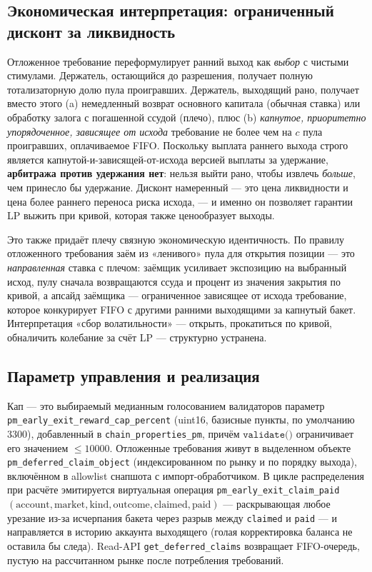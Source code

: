 \documentclass{ledger}
\theoremstyle{plain}
\theoremstyle{remark}
\begin{document}
\subsection{Экономическая интерпретация: ограниченный дисконт за ликвидность}\label{sec:defecon}

Отложенное требование переформулирует ранний выход как \emph{выбор} с чистыми
стимулами. Держатель, остающийся до разрешения, получает полную тотализаторную долю
пула проигравших. Держатель, выходящий рано, получает вместо этого (a) немедленный
возврат основного капитала (обычная ставка) или обработку залога с погашенной ссудой
(плечо), плюс (b) \emph{капнутое, приоритетно упорядоченное, зависящее от исхода}
требование не более чем на $c$ пула проигравших, оплачиваемое FIFO. Поскольку выплата
раннего выхода строго является капнутой-и-зависящей-от-исхода версией выплаты за
удержание, \textbf{арбитража против удержания нет}: нельзя выйти рано, чтобы извлечь
\emph{больше}, чем принесло бы удержание. Дисконт намеренный --- это цена ликвидности
и цена более раннего переноса риска исхода, --- и именно он позволяет гарантии LP
выжить при кривой, которая также ценообразует выходы.

Это также придаёт плечу связную экономическую идентичность. По правилу отложенного
требования заём из «ленивого» пула для открытия позиции --- это \emph{направленная}
ставка с плечом: заёмщик усиливает экспозицию на выбранный исход, пулу сначала
возвращаются ссуда и процент из значения закрытия по кривой, а апсайд заёмщика ---
ограниченное зависящее от исхода требование, которое конкурирует FIFO с другими
ранними выходящими за капнутый бакет. Интерпретация «сбор волатильности» --- открыть,
прокатиться по кривой, обналичить колебание за счёт LP --- структурно устранена.

\subsection{Параметр управления и реализация}\label{sec:defimpl}

Кап --- это выбираемый медианным голосованием валидаторов параметр
\texttt{pm\_early\_exit\_reward\_cap\_percent} (uint16, базисные пункты, по умолчанию
$3300$), добавленный в \texttt{chain\_properties\_pm}, причём $\texttt{validate()}$
ограничивает его значением $\le 10000$. Отложенные требования живут в выделенном
объекте \texttt{pm\_deferred\_claim\_object} (индексированном по рынку и по порядку
выхода), включённом в allowlist снапшота с импорт-обработчиком. В цикле распределения
при расчёте эмитируется виртуальная операция
\texttt{pm\_early\_exit\_claim\_paid}$(\text{account}, \text{market},
\text{kind}, \text{outcome}, \text{claimed}, \text{paid})$ --- раскрывающая любое
урезание из-за исчерпания бакета через разрыв между \texttt{claimed} и \texttt{paid}
--- и направляется в историю аккаунта выходящего (голая корректировка баланса не
оставила бы следа). Read-API \texttt{get\_deferred\_claims} возвращает FIFO-очередь,
пустую на рассчитанном рынке после потребления требований.
\end{document}
